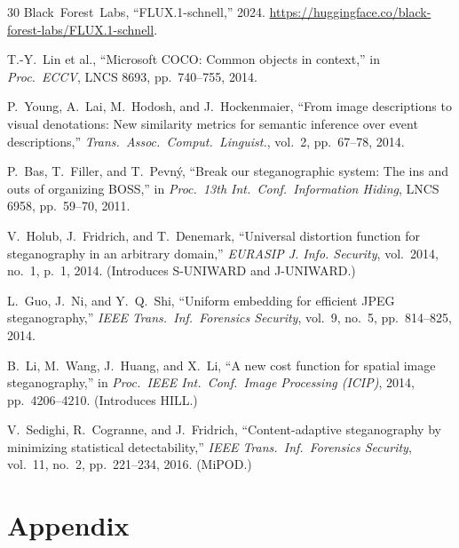 \documentclass[10pt,twocolumn,a4paper]{article}
\renewcommand{\thesection}{\Roman{section}}
\begin{document}
\begin{thebibliography}{30}
Black~Forest~Labs,
``FLUX.1-schnell,''
2024.
\url{https://huggingface.co/black-forest-labs/FLUX.1-schnell}.

T.-Y.~Lin et al.,
``Microsoft COCO: Common objects in context,''
in \textit{Proc.\ ECCV}, LNCS 8693, pp.~740--755, 2014.

P.~Young, A.~Lai, M.~Hodosh, and J.~Hockenmaier,
``From image descriptions to visual denotations: New similarity metrics for semantic inference over event descriptions,''
\textit{Trans.\ Assoc.\ Comput.\ Linguist.}, vol.~2, pp.~67--78, 2014.

P.~Bas, T.~Filler, and T.~Pevn\'{y},
``Break our steganographic system: The ins and outs of organizing BOSS,''
in \textit{Proc.\ 13th Int.\ Conf.\ Information Hiding}, LNCS 6958, pp.~59--70, 2011.

V.~Holub, J.~Fridrich, and T.~Denemark,
``Universal distortion function for steganography in an arbitrary domain,''
\textit{EURASIP J. Info. Security}, vol.~2014, no.~1, p.~1, 2014.
(Introduces S-UNIWARD and J-UNIWARD.)

L.~Guo, J.~Ni, and Y.~Q.~Shi,
``Uniform embedding for efficient JPEG steganography,''
\textit{IEEE Trans.\ Inf.\ Forensics Security}, vol.~9, no.~5, pp.~814--825, 2014.

B.~Li, M.~Wang, J.~Huang, and X.~Li,
``A new cost function for spatial image steganography,''
in \textit{Proc.\ IEEE Int.\ Conf.\ Image Processing (ICIP)}, 2014, pp.~4206--4210.
(Introduces HILL.)

V.~Sedighi, R.~Cogranne, and J.~Fridrich,
``Content-adaptive steganography by minimizing statistical detectability,''
\textit{IEEE Trans.\ Inf.\ Forensics Security}, vol.~11, no.~2, pp.~221--234, 2016.
(MiPOD.)

\end{thebibliography}

\onecolumn
\appendix
\section*{Appendix}
\renewcommand{\thesection}{\Alph{section}}
\setcounter{section}{0}
\end{document}
